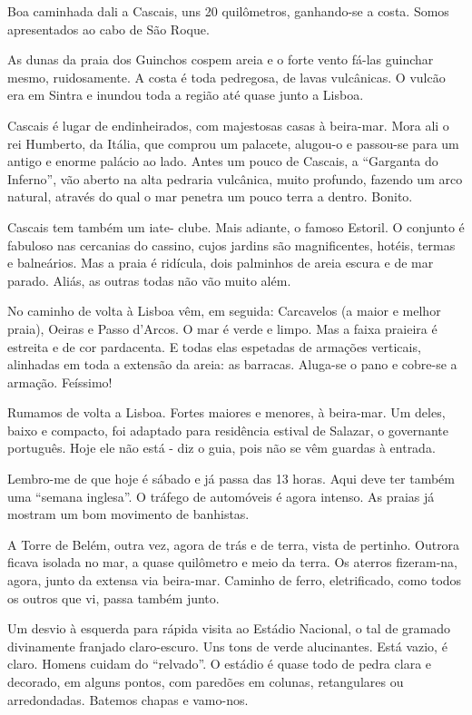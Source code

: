 Boa caminhada dali a Cascais, uns 20 quilômetros, ganhando-se a costa. Somos apresentados ao cabo de São Roque.

As dunas da praia dos Guinchos cospem areia e o forte vento fá-las guinchar mesmo, ruidosamente. A costa é toda pedregosa, de lavas vulcânicas. O vulcão era em Sintra e inundou toda a região até quase junto a Lisboa.

Cascais é lugar de endinheirados, com majestosas casas à beira-mar. Mora ali o rei Humberto, da Itália, que comprou um palacete, alugou-o e passou-se para um antigo e enorme palácio ao lado. Antes um pouco de Cascais, a “Garganta do Inferno”, vão aberto na alta pedraria vulcânica, muito profundo, fazendo um arco natural, através do qual o mar penetra um pouco terra a dentro. Bonito.

Cascais tem também um iate- clube. Mais adiante, o famoso Estoril. O conjunto é fabuloso nas cercanias do cassino, cujos jardins são magnificentes, hotéis, termas e balneários. Mas a praia é ridícula, dois palminhos de areia escura e de mar parado. Aliás, as outras todas não vão muito além.

No caminho de volta à Lisboa vêm, em seguida: Carcavelos (a maior e melhor praia), Oeiras e Passo d’Arcos. O mar é verde e limpo. Mas a faixa praieira é estreita e de cor pardacenta. E todas elas espetadas de armações verticais, alinhadas em toda a extensão da areia: as barracas. Aluga-se o pano e cobre-se a armação. Feíssimo!

Rumamos de volta a Lisboa. Fortes maiores e menores, à beira-mar. Um deles, baixo e compacto, foi adaptado para residência estival de Salazar, o governante português. Hoje ele não está - diz o guia, pois não se vêm guardas à entrada.

Lembro-me de que hoje é sábado e já passa das 13 horas. Aqui deve ter também uma “semana inglesa”. O tráfego de automóveis é agora intenso. As praias já mostram um bom movimento de banhistas.

A Torre de Belém, outra vez, agora de trás e de terra, vista de pertinho. Outrora ficava isolada no mar, a quase quilômetro e meio da terra. Os aterros fizeram-na, agora, junto da extensa via beira-mar. Caminho de ferro, eletrificado, como todos os outros que vi, passa também junto.

Um desvio à esquerda para rápida visita ao Estádio Nacional, o tal de gramado divinamente franjado claro-escuro. Uns tons de verde alucinantes. Está vazio, é claro. Homens cuidam do “relvado”. O estádio é quase todo de pedra clara e decorado, em alguns pontos, com paredões em colunas, retangulares ou arredondadas. Batemos chapas e vamo-nos.

